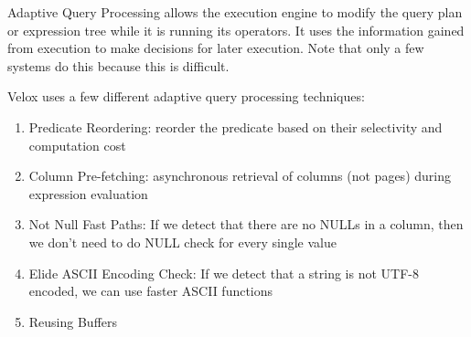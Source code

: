 \documentclass[11pt]{article}
\begin{document}
Adaptive Query Processing allows the execution engine to modify the query
plan or expression tree while it is running its operators.
It uses the information gained from execution to make decisions for later
execution. Note that only a few systems do this because this is difficult.

Velox uses a few different adaptive query processing techniques:
\begin{enumerate}
    \item Predicate Reordering: reorder the predicate based
on their selectivity and computation cost
    \item Column Pre-fetching: asynchronous retrieval of columns
(not pages) during expression evaluation
    \item Not Null Fast Paths: If we detect that there are no NULLs in a column,
then we don't need to do NULL check for every single value
    \item Elide ASCII Encoding Check: If we detect that a string is not UTF-8
encoded, we can use faster ASCII functions
    \item Reusing Buffers
\end{enumerate}




\newpage


\end{document}
